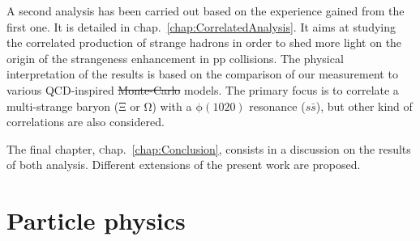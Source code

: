 \documentclass[ALICE,manyauthors]{cernphprep}
\newcommand{\chap}      {\textsc{c}hap.~}
\newcommand{\rmPhiMes}   {\mbox{$\mathrm {\phi(1020)}$}\xspace}
\newcommand{\rmXi}      {\mbox{$\mathrm{\Xi}$}\xspace}
\newcommand{\rmOmega}   {\mbox{$\mathrm {\Omega}$}\xspace}
\providecommand{\DIFaddtex}[1]{{\protect\color{blue}\uwave{#1}}} %
\providecommand{\DIFdeltex}[1]{{\protect\color{red}\sout{#1}}}                      %
\providecommand{\DIFaddbegin}{} %
\providecommand{\DIFaddend}{} %
\providecommand{\DIFdelbegin}{} %
\providecommand{\DIFdelend}{} %
\providecommand{\DIFadd}[1]{\texorpdfstring{\DIFaddtex{#1}}{#1}} %
\providecommand{\DIFdel}[1]{\texorpdfstring{\DIFdeltex{#1}}{}} %
\newcommand{\DIFscaledelfig}{0.5}
\newlength{\DIFdelgraphicswidth} %
\newlength{\DIFdelgraphicsheight} %
\newcommand{\DIFaddincludegraphics}[2][]{{\color{blue}\fbox{\DIFOincludegraphics[#1]{#2}}}} %
\newcommand{\DIFdelincludegraphics}[2][]{%
\sbox{\DIFdelgraphicsbox}{\DIFOincludegraphics[#1]{#2}}%
\settoboxwidth{\DIFdelgraphicswidth}{\DIFdelgraphicsbox} %
\settoboxtotalheight{\DIFdelgraphicsheight}{\DIFdelgraphicsbox} %
\scalebox{\DIFscaledelfig}{%
\parbox[b]{\DIFdelgraphicswidth}{\usebox{\DIFdelgraphicsbox}\\[-\baselineskip] \rule{\DIFdelgraphicswidth}{0em}}\llap{\resizebox{\DIFdelgraphicswidth}{\DIFdelgraphicsheight}{%
\setlength{\unitlength}{\DIFdelgraphicswidth}%
\begin{picture}(1,1)%
\thicklines\linethickness{2pt} %
{\color[rgb]{1,0,0}\put(0,0){\framebox(1,1){}}}%
{\color[rgb]{1,0,0}\put(0,0){\line( 1,1){1}}}%
{\color[rgb]{1,0,0}\put(0,1){\line(1,-1){1}}}%
\end{picture}%
}\hspace*{3pt}}} %
} %
\DeclareRobustCommand{\DIFaddbegin}{\DIFOaddbegin \let\includegraphics\DIFaddincludegraphics} %
\DeclareRobustCommand{\DIFaddend}{\DIFOaddend \let\includegraphics\DIFOincludegraphics} %
\DeclareRobustCommand{\DIFdelbegin}{\DIFOdelbegin \let\includegraphics\DIFdelincludegraphics} %
\DeclareRobustCommand{\DIFdelend}{\DIFOaddend \let\includegraphics\DIFOincludegraphics} %
\begin{document}
A second analysis has been carried out based on the experience gained from the first one. It is detailed in \chap\ref{chap:CorrelatedAnalysis}. It aims at studying the correlated production of strange hadrons in order to shed more light on the origin of the strangeness enhancement in pp collisions. The physical interpretation of the results is based on the comparison of our measurement to various QCD-inspired \DIFdelbegin \DIFdel{Monte-Carlo }\DIFdelend \DIFaddbegin \DIFadd{Monte Carlo }\DIFaddend models. The primary focus is to correlate a multi-strange baryon (\rmXi or \rmOmega) with a \rmPhiMes resonance ($s\bar{s}$), but other kind of correlations are also considered.


The final chapter, \chap\ref{chap:Conclusion}, consists in a discussion on the results of both analysis. Different extensions of the present work are \DIFaddbegin \DIFadd{also }\DIFaddend proposed. \newpage  %
 \newpage %

\chapter{Particle physics}
\label{chap:ParticlePhysics}
\end{document}
